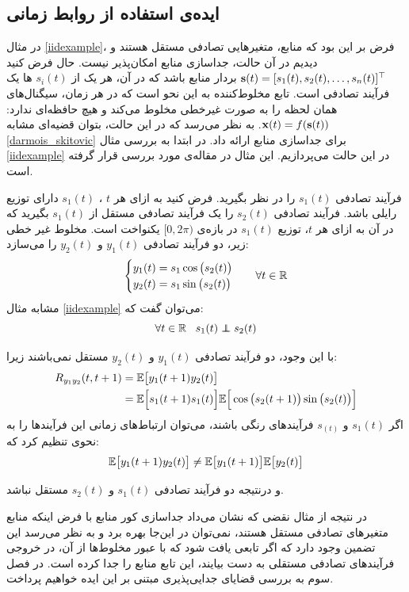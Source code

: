 \documentclass[oneside]{thesis}
\begin{document}
\subsection{ایده‌ی استفاده از روابط زمانی}

در مثال
\eqref{iidexample}،
فرض بر این بود که منابع، متغیر‌هایی تصادفی مستقل هستند و دیدیم در آن حالت، جداسازی منابع امکان‌پذیر نیست. حال فرض کنید 
$\mathbf{s}(t) = [s_1(t), s_2(t), \dots, s_n(t)]^\top$
بردار منابع باشد که در آن، هر یک از
$s_i(t)$
ها یک فرآیند تصادفی است. تابع مخلوط‌کننده به این نحو است که در هر زمان، سیگنال‌های همان لحظه را به صورت غیرخطی مخلوط می‌کند و هیچ حافظه‌ای ندارد:
$\mathbf{x}(t) = f(\mathbf{s}(t))$.
به نظر می‌رسد که در این حالت، بتوان قضیه‌ای مشابه
\eqref{darmois_skitovic}
برای جداسازی منابع ارائه داد. در ابتدا به بررسی مثال 
\eqref{iidexample}
در این حالت می‌پردازیم. این مثال در مقاله‌ی 
\cite{shahram}
مورد بررسی قرار گرفته است.

\begin{example}
	فرآیند تصادفی 
	$s_1(t)$
	را در نظر بگیرید. فرض کنید به ازای‌ هر $t$ ،
	$s_1(t)$
	دارای توزیع رایلی باشد. فرآیند تصادفی 
	$s_2(t)$
	را یک فرآیند تصادفی مستقل از 
	$s_1(t)$
	بگیرید که در آن به ازای هر $t$، توزیع 
	$s_1(t)$
	در بازه‌ی 
	$[0, 2\pi)$
	یکنواخت است.  مخلوط‌ غیر خطی زیر، دو فرآیند تصادفی 
	$y_1(t)$
	و 
	$y_2(t)$
	را می‌سازد:
	\begin{equation}
	\begin{cases}
	y_1(t) = s_1 \cos\big(s_2(t)\big)\\
	y_2(t) = s_1 \sin\big(s_2(t)\big)
	\end{cases}\;\;\;
	\forall t \in \mathbb{R}
	\end{equation}
	مشابه‌ مثال 
	\eqref{iidexample}
	می‌توان گفت که:
	$$\forall t \in \R \;\;\; s_1(t) \indep s_2(t)$$
	
	با این وجود، دو فرآیند تصادفی 
	$y_1(t)$
	و 
	$y_2(t)$
	مستقل نمی‌باشند زیرا:
	\begin{align}
	R_{y_1y_2}(t, t+1) &= \mathbb{E}\big[{y_1(t+1)y_2(t)}\big]\\
	&= \mathbb{E}\Big[s_1(t+1)s_1(t)\Big]
	\mathbb{E}\Big[\cos\big(s_2(t+1)\big)\sin\big(s_2(t)\big)\Big]
	\end{align}
	اگر 
	$s_1(t)$
	و 
	$s_(t)$
	فرآیند‌های رنگی باشند، می‌توان ارتباط‌های زمانی این فرآیند‌ها را به نحوی تنظیم کرد که:
	\begin{equation}
	\mathbb{E}\big[{y_1(t+1)y_2(t)}\big] \neq
	\mathbb{E}\big[y_1(t+1)\big] \mathbb{E}\big[y_2(t)\big]
	\end{equation}
	
	و درنتیجه دو فرآیند تصادفی 
	$s_1(t)$
	و 
	$s_2(t)$
	مستقل نباشد. 
\end{example}
در نتیجه از مثال نقضی که نشان‌ می‌داد جداسازی کور منابع با فرض اینکه منابع متغیر‌های تصادفی مستقل هستند، نمی‌توان در این‌جا بهره برد و به نظر می‌رسد این تضمین وجود دارد که اگر  تابعی  یافت شود که با عبور مخلوط‌ها از آن، در خروجی فرآیند‌های تصادفی مستقلی به دست بیایند، این تابع منابع را جدا کرده است. در فصل سوم به بررسی  قضایای جدایی‌پذیری مبتنی بر این ایده‌ خواهیم پرداخت.
\end{document}
